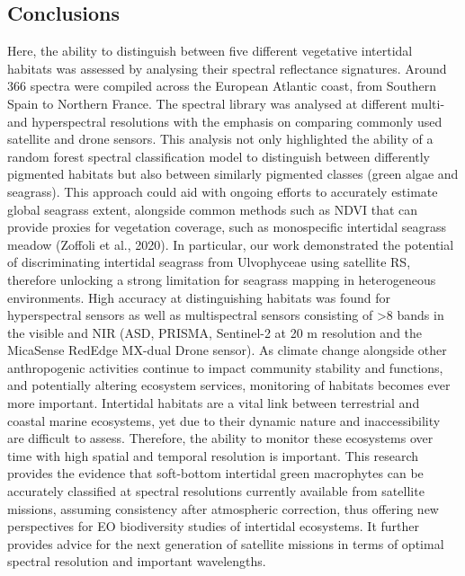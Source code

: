 \documentclass[
  letterpaper,
  11pt,
  english,
  singlespacing,
  headsepline]{MastersDoctoralThesis}
\begin{document}
\begin{spacing}{1.5}
\subsection{Conclusions}\label{conclusions}

Here, the ability to distinguish between five different vegetative
intertidal habitats was assessed by analysing their spectral reflectance
signatures. Around 366 spectra were compiled across the European
Atlantic coast, from Southern Spain to Northern France. The spectral
library was analysed at different multi- and hyperspectral resolutions
with the emphasis on comparing commonly used satellite and drone
sensors. This analysis not only highlighted the ability of a random
forest spectral classification model to distinguish between differently
pigmented habitats but also between similarly pigmented classes (green
algae and seagrass). This approach could aid with ongoing efforts to
accurately estimate global seagrass extent, alongside common methods
such as NDVI that can provide proxies for vegetation coverage, such as
monospecific intertidal seagrass meadow (Zoffoli et al., 2020). In
particular, our work demonstrated the potential of discriminating
intertidal seagrass from Ulvophyceae using satellite RS, therefore
unlocking a strong limitation for seagrass mapping in heterogeneous
environments. High accuracy at distinguishing habitats was found for
hyperspectral sensors as well as multispectral sensors consisting of
\textgreater8 bands in the visible and NIR (ASD, PRISMA, Sentinel-2 at
20 m resolution and the MicaSense RedEdge MX-dual Drone sensor). As
climate change alongside other anthropogenic activities continue to
impact community stability and functions, and potentially altering
ecosystem services, monitoring of habitats becomes ever more important.
Intertidal habitats are a vital link between terrestrial and coastal
marine ecosystems, yet due to their dynamic nature and inaccessibility
are difficult to assess. Therefore, the ability to monitor these
ecosystems over time with high spatial and temporal resolution is
important. This research provides the evidence that soft-bottom
intertidal green macrophytes can be accurately classified at spectral
resolutions currently available from satellite missions, assuming
consistency after atmospheric correction, thus offering new perspectives
for EO biodiversity studies of intertidal ecosystems. It further
provides advice for the next generation of satellite missions in terms
of optimal spectral resolution and important wavelengths.

\end{spacing}
\end{document}
